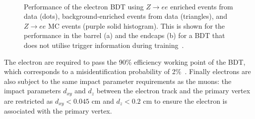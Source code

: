 \begin{figure}[t]
\centering
     \\
\caption{Performance of the electron BDT using $Z\rightarrow ee$ enriched events from data (dots), background-enriched events from data (triangles), and $Z\rightarrow ee$ MC events (purple solid histogram). This is shown for the performance in the barrel (a) and the endcaps (b) for a BDT that does not utilise trigger information during training~\cite{CMS:2015xaf}.}
\label{fig:muon_eff}
\end{figure}

The electron are required to pass the 90\% efficiency working point of the \ac{BDT}, which corresponds to a misidentification probability of 2\%~\cite{CMS:2015xaf}. 
Finally electrons are also subject to the same impact parameter requirements as the muons: the impact parameters $d_{xy}$ and $d_{z}$ between the electron track and the primary vertex are restricted as $d_{xy}<0.045$ cm and $d_{z}<0.2$ cm to ensure the electron is associated with the primary vertex. \\

